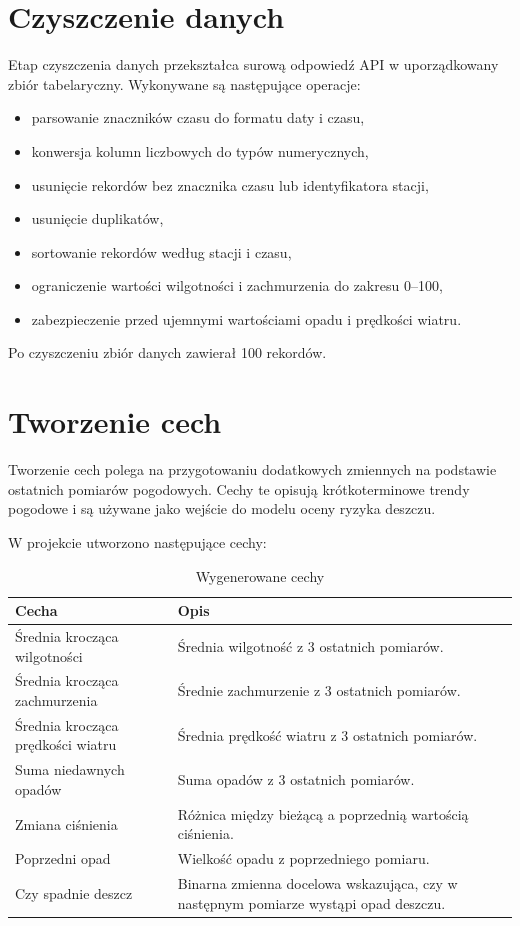 \documentclass[12pt,a4paper]{article}
\begin{document}
\section{Czyszczenie danych}

Etap czyszczenia danych przekształca surową odpowiedź API w uporządkowany zbiór tabelaryczny. Wykonywane są następujące operacje:

\begin{itemize}
\item parsowanie znaczników czasu do formatu daty i czasu,
\item konwersja kolumn liczbowych do typów numerycznych,
\item usunięcie rekordów bez znacznika czasu lub identyfikatora stacji,
\item usunięcie duplikatów,
\item sortowanie rekordów według stacji i czasu,
\item ograniczenie wartości wilgotności i zachmurzenia do zakresu 0--100,
\item zabezpieczenie przed ujemnymi wartościami opadu i prędkości wiatru.
\end{itemize}

Po czyszczeniu zbiór danych zawierał 100 rekordów.

\section{Tworzenie cech}

Tworzenie cech polega na przygotowaniu dodatkowych zmiennych na podstawie ostatnich pomiarów pogodowych. Cechy te opisują krótkoterminowe trendy pogodowe i są używane jako wejście do modelu oceny ryzyka deszczu.

W projekcie utworzono następujące cechy:

\begin{table}[H]
\centering
\begin{tabular}{p{5.5cm} p{8.5cm}}
\toprule
\textbf{Cecha} & \textbf{Opis} \\
\midrule
Średnia krocząca wilgotności & Średnia wilgotność z 3 ostatnich pomiarów. \\
Średnia krocząca zachmurzenia & Średnie zachmurzenie z 3 ostatnich pomiarów. \\
Średnia krocząca prędkości wiatru & Średnia prędkość wiatru z 3 ostatnich pomiarów. \\
Suma niedawnych opadów & Suma opadów z 3 ostatnich pomiarów. \\
Zmiana ciśnienia & Różnica między bieżącą a poprzednią wartością ciśnienia. \\
Poprzedni opad & Wielkość opadu z poprzedniego pomiaru. \\
Czy spadnie deszcz & Binarna zmienna docelowa wskazująca, czy w następnym pomiarze wystąpi opad deszczu. \\
\bottomrule
\end{tabular}
\caption{Wygenerowane cechy}
\end{table}
\end{document}
